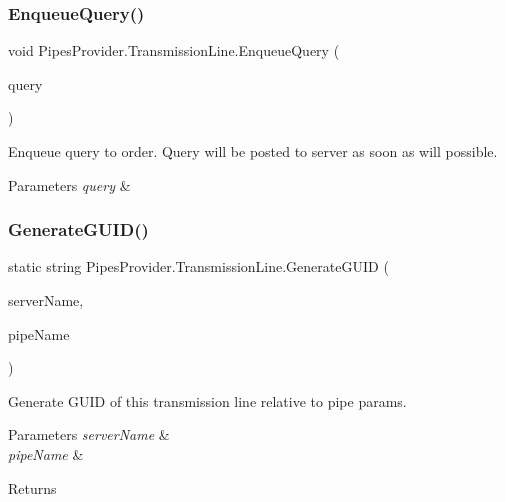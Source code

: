 \subsubsection{\texorpdfstring{Enqueue\+Query()}{EnqueueQuery()}\hspace{0.1cm}{\footnotesize\ttfamily [2/2]}}
{\footnotesize\ttfamily void Pipes\+Provider.\+Transmission\+Line.\+Enqueue\+Query (\begin{DoxyParamCaption}\item[{\mbox{\hyperlink{struct_pipes_provider_1_1_query_container}{Query\+Container}}}]{query }\end{DoxyParamCaption})}



Enqueue query to order. Query will be posted to server as soon as will possible. 


\begin{DoxyParams}{Parameters}
{\em query} & \\
\hline
\end{DoxyParams}
\mbox{\label{class_pipes_provider_1_1_transmission_line_a1d9e1c1ba799548f3723e31cf5eece6e}} 
\subsubsection{\texorpdfstring{Generate\+G\+U\+I\+D()}{GenerateGUID()}}
{\footnotesize\ttfamily static string Pipes\+Provider.\+Transmission\+Line.\+Generate\+G\+U\+ID (\begin{DoxyParamCaption}\item[{string}]{server\+Name,  }\item[{string}]{pipe\+Name }\end{DoxyParamCaption})\hspace{0.3cm}{\ttfamily [static]}}



Generate G\+U\+ID of this transmission line relative to pipe params. 


\begin{DoxyParams}{Parameters}
{\em server\+Name} & \\
\hline
{\em pipe\+Name} & \\
\hline
\end{DoxyParams}
\begin{DoxyReturn}{Returns}

\end{DoxyReturn}
\mbox{\label{class_pipes_provider_1_1_transmission_line_ac3fe155028466c724c1efe9abb4b1c02}} 
